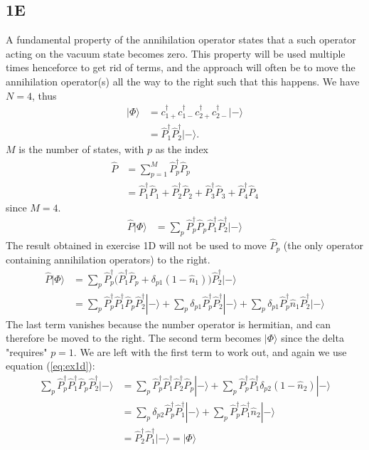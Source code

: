 \documentclass[norsk,a4paper,12pt]{article}
\begin{document}
\subsection*{1E}
A fundamental property of the annihilation operator states that a such operator acting on the vacuum state becomes zero. This property will be used multiple times henceforce to get rid of terms, and the approach will often be to move the annihilation operator(s) all the way to the right such that this happens. 
We have $N=4$, thus 
\begin{align}
|\Phi\rangle&=c_{1+}^{\dagger}c_{1-}^{\dagger}c_{2+}^{\dagger}c_{2-}^{\dagger}|-\rangle\\
&=\hat{P}_1^{\dagger}\hat{P}_2^{\dagger}|-\rangle.
\end{align}
$M$ is the number of states, with $p$ as the index
\begin{align}
\hat{P}&=\sum_{p=1}^M\hat{P}_p^{\dagger}\hat{P}_p\\
&=\hat{P}_1^{\dagger}\hat{P}_1+\hat{P}_2^{\dagger}\hat{P}_2+\hat{P}_3^{\dagger}\hat{P}_3+\hat{P}_4^{\dagger}\hat{P}_4
\end{align}
since $M=4$. 
\begin{align}
\hat{P}|\Phi\rangle&=\sum_p\hat{P}_p^{\dagger}\hat{P}_p\hat{P}_1^{\dagger}\hat{P}_2^{\dagger}|-\rangle
\end{align}
The result obtained in exercise 1D will not be used to move $\hat{P}_p$ (the only operator containing annihilation operators) to the right. 
\begin{align*}
\hat{P}|\Phi\rangle
&=\sum_p\hat{P}_p^{\dagger}\Big(\hat{P}_1^{\dagger}\hat{P}_p+\delta_{p1}(1-\hat{n}_1)\Big)\hat{P}_2^{\dagger}|-\rangle\\
&=\sum_p\hat{P}_p^{\dagger}\hat{P}_1^{\dagger}\hat{P}_p\hat{P}_2^{\dagger}|-\rangle+\sum_p\delta_{p1}\hat{P}_p^{\dagger}\hat{P}_2^{\dagger}|-\rangle+\sum_p\delta_{p1}\hat{P}_p^{\dagger}\hat{n}_1\hat{P}_2^{\dagger}|-\rangle
\end{align*}
The last term vanishes because the number operator is hermitian, and can therefore be moved to the right. The second term becomes $|\Phi\rangle$ since the delta "requires" $p=1$. We are left with the first term to work out, and again we use equation (\ref{eq:ex1d}):
\begin{align*}
\sum_p\hat{P}_p^{\dagger}\hat{P}_1^{\dagger}\hat{P}_p\hat{P}_2^{\dagger}|-\rangle
&=\sum_p\hat{P}_p^{\dagger}\hat{P}_1^{\dagger}\hat{P}_2^{\dagger}\hat{P}_p|-\rangle+\sum_p\hat{P}_p^{\dagger}\hat{P}_1^{\dagger}\delta_{p2}(1-\hat{n}_2)|-\rangle\\
&=\sum_p\delta_{p2}\hat{P}_p^{\dagger}\hat{P}_1^{\dagger}|-\rangle+\sum_p\hat{P}_p^{\dagger}\hat{P}_1^{\dagger}\hat{n}_2|-\rangle\\
&=\hat{P}_2^{\dagger}\hat{P}_1^{\dagger}|-\rangle=|\Phi\rangle
\end{align*}
\end{document}
